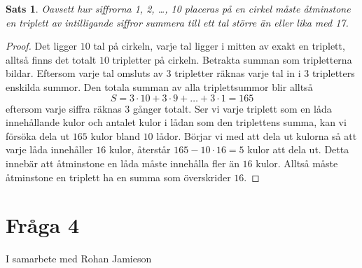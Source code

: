 \documentclass{article}
\newtheorem{theorem}{Sats}
\begin{document}
\begin{theorem}
	Oavsett hur siffrorna 1, 2, \ldots, 10 placeras på en cirkel måste åtminstone en triplett av intilligande siffror summera till ett tal större än eller lika med 17.
\end{theorem}

\begin{proof}
Det ligger $10$ tal på cirkeln, varje tal ligger i mitten av exakt en triplett, alltså finns det totalt $10$ tripletter på cirkeln. Betrakta summan som tripletterna bildar. Eftersom varje tal omsluts av $3$ tripletter räknas varje tal in i $3$ tripletters enskilda summor. Den totala summan av alla triplettsummor blir alltså
 \[
S = 3 \cdot 10 + 3 \cdot 9 + \ldots + 3 \cdot 1 = 165
\] 
eftersom varje siffra räknas $3$ gånger totalt. Ser vi varje triplett som en låda innehållande kulor och antalet kulor i lådan som den triplettens summa, kan vi försöka dela ut $165$ kulor bland $10$ lådor. Börjar vi med att dela ut kulorna så att varje låda innehåller $16$ kulor, återstår  $165 - 10 \cdot 16 = 5$ kulor att dela ut. Detta innebär att åtminstone en låda måste innehålla fler än $16$ kulor. Alltså måste åtminstone en triplett ha en summa som överskrider $16$.
\end{proof}

\section{Fråga 4}
I samarbete med Rohan Jamieson
\end{document}
